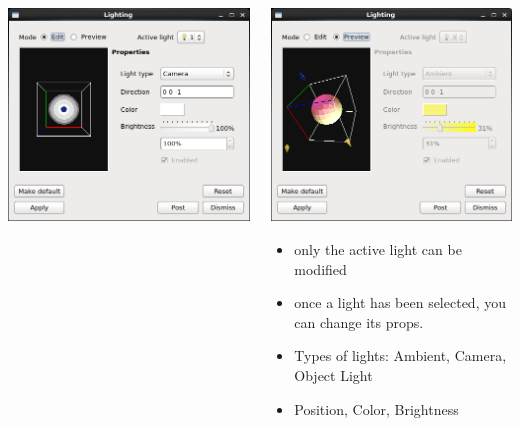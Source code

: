 \begin{frame}
\begin{columns}[T]
\begin{column}{6cm}
\begin{block}{}
	\centering
	\vspace{-2mm}
	\includegraphics[width=.65\columnwidth]{figs/visit-guis/visit_lighting}
	\end{block}
\end{column}
\begin{column}{5.5cm}
	\pause
        \includegraphics[width=.85\columnwidth]{figs/visit-guis/visit_lighting2}

	\vspace{-2mm}
	\begin{block}{}
	\begin{itemize}
		\item only the active light can be modified
		\item once a light has been selected, you can change its props.
		\item Types of lights: Ambient, Camera, Object Light
		\item Position, Color, Brightness
	\end{itemize}
	\end{block}
\end{column}
\end{columns}
\end{frame}


